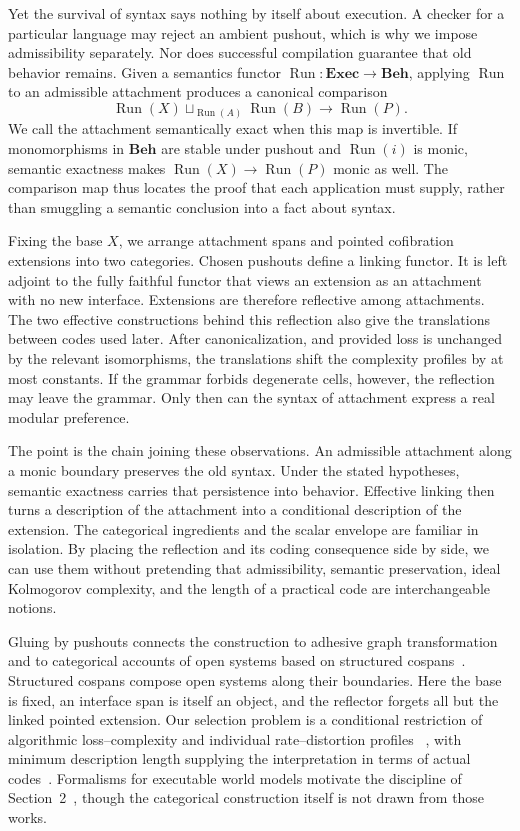 \documentclass[11pt]{article}
\newcommand{\Exec}{\mathbf{Exec}}
\newcommand{\Beh}{\mathbf{Beh}}
\DeclareMathOperator{\Run}{Run}
\begin{document}
Yet the survival of syntax says nothing by itself about execution.  A checker
for a particular language may reject an ambient pushout, which is why we impose
admissibility separately.  Nor does successful compilation guarantee that old
behavior remains.  Given a semantics functor
\(\Run:\Exec\to\Beh\), applying \(\Run\) to an admissible attachment produces
a canonical comparison
\[
 \Run(X)\sqcup_{\Run(A)}\Run(B)\longrightarrow\Run(P).
\]
We call the attachment semantically exact when this map is invertible.  If
monomorphisms in \(\Beh\) are stable under pushout and \(\Run(i)\) is monic,
semantic exactness makes \(\Run(X)\to\Run(P)\) monic as well.  The comparison
map thus locates the proof that each application must supply, rather than
smuggling a semantic conclusion into a fact about syntax.

Fixing the base \(X\), we arrange attachment spans and pointed cofibration
extensions into two categories.  Chosen pushouts define a linking functor.  It
is left adjoint to the fully faithful functor that views an extension as an
attachment with no new interface.  Extensions are therefore reflective among
attachments.  The two effective constructions behind this reflection also
give the translations between codes used later.  After canonicalization, and
provided loss is unchanged by the relevant isomorphisms, the translations
shift the complexity profiles by at most constants.  If the grammar forbids
degenerate cells, however, the reflection may leave the grammar.  Only then
can the syntax of attachment express a real modular preference.

The point is the chain joining these observations.  An admissible attachment
along a monic boundary preserves the old syntax.  Under the stated hypotheses,
semantic exactness carries that persistence into behavior.  Effective linking
then turns a description of the attachment into a conditional description of
the extension.  The categorical ingredients and the scalar envelope are
familiar in isolation.  By placing the reflection and its coding consequence
side by side, we can use them without pretending that admissibility, semantic
preservation, ideal Kolmogorov complexity, and the length of a practical code
are interchangeable notions.

Gluing by pushouts connects the construction to adhesive graph transformation
~\cite{lack,toposes} and to categorical accounts of open systems based on
structured cospans~\cite{baezcourser}.  Structured cospans compose open systems
along their boundaries.  Here the base is fixed, an interface span is itself
an object, and the reflector forgets all but the linked pointed extension.
Our selection problem is a conditional restriction of algorithmic
loss--complexity and individual rate--distortion profiles
~\cite{vereshchagin,vereshchagin2010}, with minimum description length
supplying the interpretation in terms of actual codes~\cite{rissanen}.
Formalisms for executable world models motivate the discipline of
Section~2~\cite{schmidhuber1991,schmidhuber2004,steunebrink2013}, though the
categorical construction itself is not drawn from those works.
\end{document}
